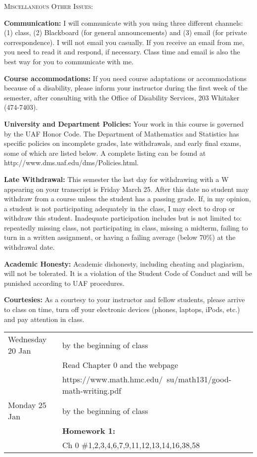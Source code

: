 \documentclass[11pt]{article}
\begin{document}
{{\textsc{Miscellaneous Other Issues:}

\textbf{Communication:} I will communicate with you using three different channels: (1) class, (2) Blackboard (for general announcements) and (3) email (for private correspondence). I will not email you casually. If you receive an email from me, you need to read it and respond, if necessary.  Class time and email is also the best way for you to communicate with me. 

\textbf{Course accommodations:} If you need course adaptations or accommodations because of a
disability, please inform your instructor during the first week of the semester, after consulting
with the Office of Disability Services, 203 Whitaker (474-7403).

\textbf{University and Department Policies:} Your work in this course is governed by the UAF Honor
Code. The Department of Mathematics and Statistics has specific policies on incomplete grades,
late withdrawals, and early final exams, some of which are listed below. A complete listing
can be found at
http://www.dms.uaf.edu/dms/Policies.html.

\textbf{Late Withdrawal:} This semester the last day for withdrawing with a W  appearing on your
transcript is Friday March 25. After this date no student may withdraw from a course unless the student has a passing grade. If, in my opinion, a student is not participating adequately in the
class, I may elect to drop or withdraw this student. Inadequate participation includes but is not limited to: repeatedly missing class, not participating in class, missing a midterm, failing to turn in a written assignment, or having a failing average (below 70\%) at the withdrawal date.

\textbf{Academic Honesty:} Academic dishonesty, including cheating and plagiarism, will not be tolerated. It is a violation of the Student Code of Conduct and will be punished according to
UAF procedures.

\textbf{Courtesies:} As a courtesy to your instructor and fellow students, please arrive to class on
time, turn off your electronic devices (phones, laptops, iPods, etc.) and pay attention in class.\\

\vfill

\begin{center} \end{center} 

\begin{tabular}{ll}
Wednesday 20 Jan & by the beginning of class\\
& Read Chapter 0 and the webpage \\
& https://www.math.hmc.edu/~su/math131/good-math-writing.pdf \\
Monday 25 Jan & by the beginning of class\\
& \textbf{Homework 1:}\\
& Ch 0 \#1,2,3,4,6,7,9,11,12,13,14,16,38,58\\
\end{tabular}

}}
\end{document}
